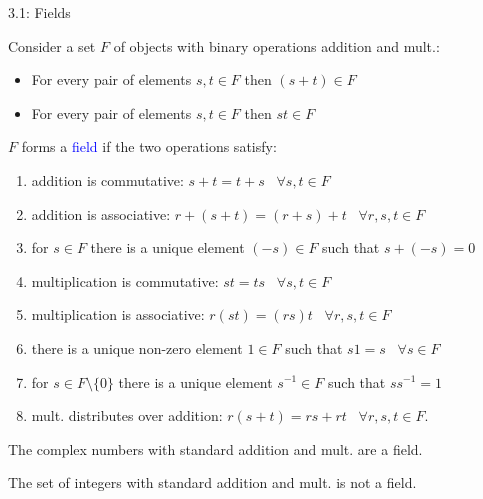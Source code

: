 \documentclass[10pt,letterpaper,english]{beamer}
\begin{document}
\fi

\begin{frame}{3.1: Fields}

Consider a set $F$ of objects with binary operations addition and mult.:
\begin{itemize}
\item For every pair of elements $s, t \in F$ then $(s + t) \in F$
\item For every pair of elements $s, t \in F$ then $s t \in F$
\end{itemize}
\vspace{1.5mm}
$F$ forms a \textcolor{blue}{field} if the two operations satisfy:
\begin{enumerate}
\item addition is commutative: $s + t = t + s \;\;\; \forall s, t \in F$
\item addition is associative: $r + (s + t) = (r + s) + t \;\;\; \forall r, s, t \in F$
\item for $s \in F$ there is a unique element $(-s) \in F$ such that $s + (-s) = 0$
\item multiplication is commutative: $st = ts \;\;\; \forall s,t \in F$
\item multiplication is associative: $r(st) = (rs)t \;\;\; \forall r, s, t \in F$
\item there is a unique non-zero element $1 \in F$ such that $s1 = s \;\;\; \forall s \in F$
\item for $s \in F \setminus\{0\}$ there is a unique element $s^{-1} \in F$ such that $s s^{-1} = 1$
\item mult. distributes over addition: $r (s + t) = rs + rt \;\;\; \forall r, s, t \in F$.
\end{enumerate}

\begin{example}
The complex numbers with standard addition and mult. are a field.
\end{example}

\begin{example}
The set of integers with standard addition and mult. is not a field.
\end{example}

\end{frame}
\end{document}
